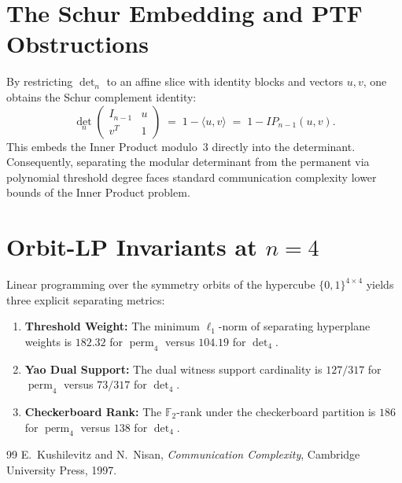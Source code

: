 \documentclass[11pt,a4paper]{amsart}
\newcommand{\perm}{\operatorname{perm}}
\newcommand{\FF}{\mathbb{F}}
\theoremstyle{definition}
\begin{document}
\section{The Schur Embedding and PTF Obstructions}

By restricting $\det_n$ to an affine slice with identity blocks and vectors $u, v$,
one obtains the Schur complement identity:
\[
  \det_n \begin{pmatrix} I_{n-1} & u \\ v^T & 1 \end{pmatrix} \;=\; 1 - \langle u, v \rangle \;=\; 1 - IP_{n-1}(u, v).
\]
This embeds the Inner Product modulo~$3$ directly into the determinant.
Consequently, separating the modular determinant from the permanent via polynomial threshold
degree faces standard communication complexity lower bounds of the Inner Product problem.

\section{Orbit-LP Invariants at $n=4$}

Linear programming over the symmetry orbits of the hypercube $\{0,1\}^{4 \times 4}$
yields three explicit separating metrics:
\begin{enumerate}
  \item \textbf{Threshold Weight:} The minimum $\ell_1$-norm of separating hyperplane weights
        is $182.32$ for $\perm_4$ versus $104.19$ for $\det_4$.
  \item \textbf{Yao Dual Support:} The dual witness support cardinality is $127/317$ for $\perm_4$
        versus $73/317$ for $\det_4$.
  \item \textbf{Checkerboard Rank:} The $\FF_2$-rank under the checkerboard partition is
        $186$ for $\perm_4$ versus $138$ for $\det_4$.
\end{enumerate}

\begin{thebibliography}{99}
  E.~Kushilevitz and N.~Nisan,
  \emph{Communication Complexity},
  Cambridge University Press, 1997.
\end{thebibliography}
\end{document}
